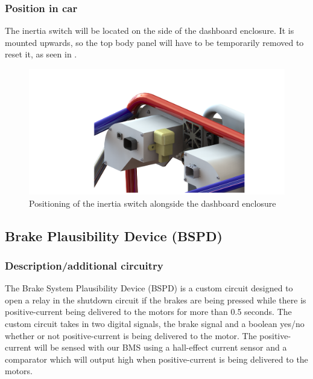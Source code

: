 \documentclass{article}
\begin{document}
\subsubsection{Position in car}
The inertia switch will be located on the side of the dashboard enclosure. It is mounted upwards, so the top body panel will have to be temporarily removed to reset it, as seen in .

  \begin{figure}[H]
  \centering
  \includegraphics[width = 0.9 \textwidth]{ImpactSensor3-1-17}
  \caption{Positioning of the inertia switch alongside the dashboard enclosure}
  \label{fig:inertia_switch_mount}
  \end{figure}


\subsection{Brake Plausibility Device (BSPD)}\label{brake_plausibility_device}
\subsubsection{Description/additional circuitry}

The Brake System Plausibility Device (BSPD) is a custom circuit designed to open a relay in the shutdown circuit if the brakes are being pressed while there is positive-current being delivered to the motors for more than 0.5 seconds. The custom circuit takes in two digital signals, the brake signal and a boolean yes/no whether or not positive-current is being delivered to the motor. The positive-current will be sensed with our BMS using a hall-effect current sensor and a comparator which will output high when positive-current is being delivered to the motors. \\
\end{document}
